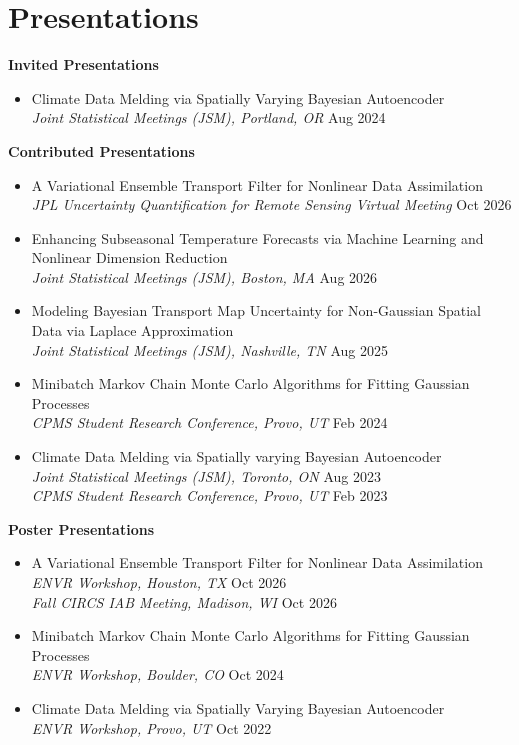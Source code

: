 \documentclass[11pt, letterpaper]{article}
\begin{document}
\section{Presentations}
\textbf{Invited Presentations}
\begin{itemize}
	\item Climate Data Melding via Spatially Varying Bayesian Autoencoder \\
	\tab \textit{Joint Statistical Meetings (JSM), Portland, OR} \hfill Aug 2024
\end{itemize}

\vspace{4pt}
\textbf{Contributed Presentations}
\begin{itemize}
	\item A Variational Ensemble Transport Filter for Nonlinear Data Assimilation \\
	\tab \textit{JPL Uncertainty Quantification for Remote Sensing Virtual Meeting} \hfill Oct 2026
	\item \raggedright Enhancing Subseasonal Temperature Forecasts via Machine Learning and Nonlinear Dimension Reduction \\
	\tab \textit{Joint Statistical Meetings (JSM), Boston, MA} \hfill Aug 2026
	\item Modeling Bayesian Transport Map Uncertainty for Non-Gaussian Spatial Data via Laplace Approximation \\
	\tab \textit{Joint Statistical Meetings (JSM), Nashville, TN} \hfill Aug 2025
	\item Minibatch Markov Chain Monte Carlo Algorithms for Fitting Gaussian Processes \\
	\tab \textit{CPMS Student Research Conference, Provo, UT} \hfill Feb 2024
    \item Climate Data Melding via Spatially varying Bayesian Autoencoder \\
	\tab \textit{Joint Statistical Meetings (JSM), Toronto, ON} \hfill Aug 2023 \\
    \tab \textit{CPMS Student Research Conference, Provo, UT} \hfill Feb 2023
\end{itemize}

\vspace{4pt}
\textbf{Poster Presentations}
\begin{itemize}
	\item A Variational Ensemble Transport Filter for Nonlinear Data Assimilation \\
	\tab \textit{ENVR Workshop, Houston, TX} \hfill Oct 2026 \\
	\tab \textit{Fall CIRCS IAB Meeting, Madison, WI} \hfill Oct 2026
	\item Minibatch Markov Chain Monte Carlo Algorithms for Fitting Gaussian Processes \\
	\tab \textit{ENVR Workshop, Boulder, CO} \hfill Oct 2024
    \item Climate Data Melding via Spatially Varying Bayesian Autoencoder \\
    \tab \textit{ENVR Workshop, Provo, UT} \hfill Oct 2022
\end{itemize}
\end{document}
